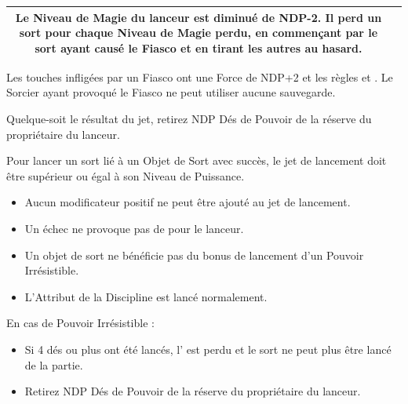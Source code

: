 \begin{multicols}{2}
\begin{center}
\begin{tabular}{cm{6.75cm}@{}}
\vspace*{3pt}
Le Niveau de Magie du lanceur est diminué de NDP-2. Il perd un sort pour chaque Niveau de Magie perdu, en commençant par le sort ayant causé le Fiasco et en tirant les autres au hasard.\tabularnewline
\hline
\end{tabular}
\end{center}

\vspace*{5pt}
\noindent Les touches infligées par un Fiasco ont une Force de NDP+2 et les règles \magicalattacks{} et . Le Sorcier ayant provoqué le Fiasco ne peut utiliser aucune sauvegarde.

\vspace*{5pt}
\noindent Quelque-soit le résultat du jet, retirez NDP Dés de Pouvoir de la réserve du propriétaire du lanceur.

\vspace*{10pt}
\begin{framed}
\vspace*{-17pt}
\basicsubtitle{\boundspells{}}

\noindent Pour lancer un sort lié à un Objet de Sort avec succès, le jet de lancement doit être supérieur ou égal à son Niveau de Puissance.
\begin{itemize}[label={-}, itemsep=3pt]
\item Aucun modificateur positif ne peut être ajouté au jet de lancement.
\item Un échec ne provoque pas de \lostfocus{} pour le lanceur.
\item Un objet de sort ne bénéficie pas du bonus de lancement d'un Pouvoir Irrésistible.
\item L'Attribut de la Discipline est lancé normalement.
\end{itemize}

\noindent En cas de Pouvoir Irrésistible :
\begin{itemize}[label={-}, itemsep=3pt]
\item Si 4 dés ou plus ont été lancés, l'\boundspell{} est perdu et le sort ne peut plus être lancé de la partie.
\item Retirez NDP Dés de Pouvoir de la réserve du propriétaire du lanceur.
\end{itemize}
\end{framed}

\vspace*{\fill}
\end{multicols}


